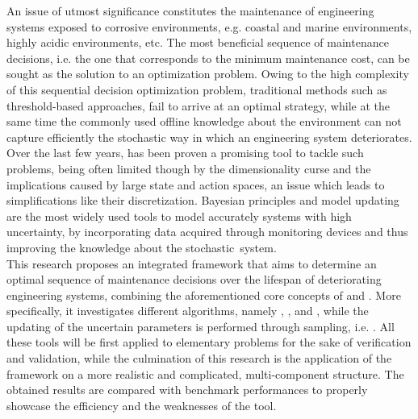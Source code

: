 An issue of utmost significance constitutes the maintenance of engineering systems exposed to corrosive environments, e.g. coastal and marine environments, highly acidic environments, etc. The most beneficial sequence of maintenance decisions, i.e. the one that corresponds to the minimum maintenance cost, can be sought as the solution to an optimization problem. Owing to the high complexity of this sequential decision optimization problem, traditional methods such as threshold-based approaches, fail to arrive at an optimal strategy, while at the same time the commonly used offline knowledge about the environment can not capture efficiently the stochastic way in which an engineering system deteriorates. Over the last few years,  has been proven a promising tool to tackle such problems, being often limited though by the dimensionality curse and the implications caused by large state and action spaces, an issue which leads to simplifications like their discretization. Bayesian principles and model updating are the most widely used tools to model accurately systems with high uncertainty, by incorporating data acquired through monitoring devices and thus improving the knowledge about the stochastic~system. \\

This research proposes an integrated framework that aims to determine an optimal sequence of maintenance decisions over the lifespan of deteriorating engineering systems, combining the aforementioned core concepts of  and . More specifically, it investigates different  algorithms, namely , , and , while the updating of the uncertain parameters is performed through sampling, i.e. . All these tools will be first applied to elementary problems for the sake of verification and validation, while the culmination of this research is the application of the framework on a more realistic and complicated, multi-component structure. The obtained results are compared with benchmark performances to properly showcase the efficiency and the weaknesses of the tool.